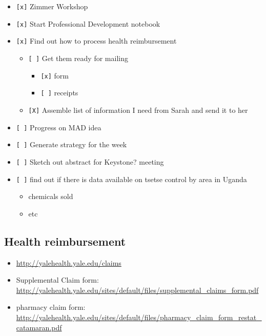 \documentclass[letterpaper]{scrartcl}
\begin{document}
\begin{itemize}
\itemsep1pt\parskip0pt
\item
  \texttt{{[}x{]}} Zimmer Workshop
\item
  \texttt{{[}x{]}} Start Professional Development notebook
\item
  \texttt{{[}x{]}} Find out how to process health reimbursement

  \begin{itemize}
  \itemsep1pt\parskip0pt
  \item
    \texttt{{[} {]}} Get them ready for mailing

    \begin{itemize}
    \itemsep1pt\parskip0pt
    \item
      \texttt{{[}x{]}} form
    \item
      \texttt{{[} {]}} receipts
    \end{itemize}
  \item
    \texttt{{[}X{]}} Assemble list of information I need from Sarah and
    send it to her
  \end{itemize}
\item
  \texttt{{[} {]}} Progress on MAD idea
\item
  \texttt{{[} {]}} Generate strategy for the week
\item
  \texttt{{[} {]}} Sketch out abstract for Keystone? meeting
\item
  \texttt{{[} {]}} find out if there is data available on tsetse control
  by area in Uganda

  \begin{itemize}
  \itemsep1pt\parskip0pt
  \item
    chemicals sold
  \item
    etc
  \end{itemize}
\end{itemize}

\subsection{Health reimbursement}\label{health-reimbursement}

\begin{itemize}
\itemsep1pt\parskip0pt
\item
  \url{http://yalehealth.yale.edu/claims}
\item
  Supplemental Claim form:
  \url{http://yalehealth.yale.edu/sites/default/files/supplemental_claims_form.pdf}
\item
  pharmacy claim form:
  \url{http://yalehealth.yale.edu/sites/default/files/pharmacy_claim_form_restat_catamaran.pdf}
\end{itemize}
\end{document}
